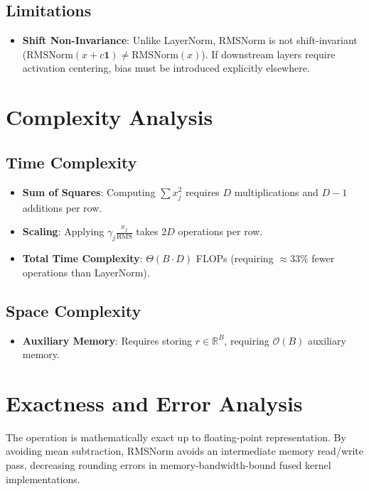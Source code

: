 \documentclass[11pt,a4paper]{article}
\theoremstyle{definition}
\begin{document}
\subsection{Limitations}
\begin{itemize}
    \item \textbf{Shift Non-Invariance}: Unlike LayerNorm, RMSNorm is not shift-invariant ($\text{RMSNorm}(x + c\mathbf{1}) \ne \text{RMSNorm}(x)$). If downstream layers require activation centering, bias must be introduced explicitly elsewhere.
\end{itemize}

\section{Complexity Analysis}

\subsection{Time Complexity}
\begin{itemize}
    \item \textbf{Sum of Squares}: Computing $\sum x_j^2$ requires $D$ multiplications and $D-1$ additions per row.
    \item \textbf{Scaling}: Applying $\gamma_j \frac{x_j}{\text{RMS}}$ takes $2D$ operations per row.
    \item \textbf{Total Time Complexity}: $\Theta(B \cdot D)$ FLOPs (requiring $\approx 33\%$ fewer operations than LayerNorm).
\end{itemize}

\subsection{Space Complexity}
\begin{itemize}
    \item \textbf{Auxiliary Memory}: Requires storing $r \in \mathbb{R}^B$, requiring $\mathcal{O}(B)$ auxiliary memory.
\end{itemize}

\section{Exactness and Error Analysis}

The operation is mathematically exact up to floating-point representation. By avoiding mean subtraction, RMSNorm avoids an intermediate memory read/write pass, decreasing rounding errors in memory-bandwidth-bound fused kernel implementations.
\end{document}
